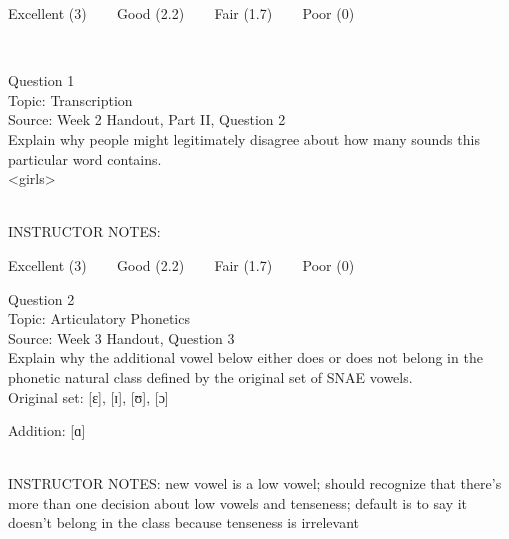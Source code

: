 \documentclass[12pt]{article}
\begin{document}
\vfill
Excellent (3) ~~~ Good (2.2) ~~~ Fair (1.7) ~~~ Poor (0)
\newpage

\begin{center}
\textbf{{\color{red}{\HUGE END OF EXAM}}}\\

\end{center}
\newpage

\begin{center}
\textbf{{\color{blue}{\HUGE START OF EXAM\\}}}

\textbf{{\color{blue}{\HUGE Student ID: 71468\\}}}

\textbf{{\color{blue}{\HUGE \\}}}

\end{center}
\newpage

{\large Question 1}\\

Topic: Transcription\\
Source: Week 2 Handout, Part II, Question 2\\

Explain why people might legitimately disagree about how many sounds this particular word contains.\\

<girls>


~\\
INSTRUCTOR NOTES: 


\vfill
Excellent (3) ~~~ Good (2.2) ~~~ Fair (1.7) ~~~ Poor (0)
\newpage

{\large Question 2}\\

Topic: Articulatory Phonetics\\
Source: Week 3 Handout, Question 3\\

Explain why the additional vowel below either does or does not belong in the phonetic natural class defined by the original set of SNAE vowels.\\

Original set: {[ɛ]}, {[ɪ]}, {[ʊ]}, {[ɔ]}

Addition: {[ɑ]}


~\\
INSTRUCTOR NOTES: new vowel is a low vowel; should recognize that there's more than one decision about low vowels and tenseness; default is to say it doesn't belong in the class because tenseness is irrelevant
\end{document}
